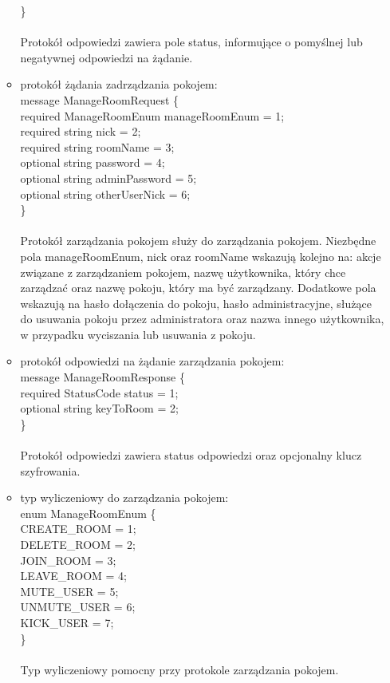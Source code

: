 \documentclass{article}
\begin{document}
\begin{itemize}
\begin{itemize}
				\}\\
				\\
				Protokół odpowiedzi zawiera pole status, informujące o pomyślnej lub negatywnej odpowiedzi na żądanie.
			\item protokół żądania zadrządzania pokojem:\\
				message ManageRoomRequest \{\\
					required ManageRoomEnum manageRoomEnum = 1;\\
					required string nick = 2;\\
					required string roomName = 3;\\
					optional string password = 4;\\
					optional string adminPassword = 5;\\
					optional string otherUserNick = 6;\\
				\}\\
				\\
				Protokół zarządzania pokojem służy do zarządzania pokojem. Niezbędne pola manageRoomEnum, nick oraz roomName wskazują kolejno na: akcje związane z zarządzaniem pokojem, nazwę użytkownika, który chce zarządzać oraz nazwę pokoju, który ma być zarządzany. Dodatkowe pola wskazują na hasło dołączenia do pokoju, hasło administracyjne, służące do usuwania pokoju przez administratora oraz nazwa innego użytkownika, w przypadku wyciszania lub usuwania z pokoju.
			\item protokół odpowiedzi na żądanie zarządzania pokojem:\\
				message ManageRoomResponse \{\\
					required StatusCode status = 1;\\
					optional string keyToRoom = 2;\\
				\}\\
				\\
				Protokół odpowiedzi zawiera status odpowiedzi oraz opcjonalny klucz szyfrowania.
			\item typ wyliczeniowy do zarządzania pokojem:\\
				enum ManageRoomEnum \{\\
					CREATE\_ROOM = 1;\\
					DELETE\_ROOM = 2;\\
					JOIN\_ROOM = 3;\\
					LEAVE\_ROOM = 4;\\
					MUTE\_USER = 5;\\
					UNMUTE\_USER = 6;\\
					KICK\_USER = 7;\\
				\}\\
				\\
				Typ wyliczeniowy pomocny przy protokole zarządzania pokojem.
				

\end{itemize}
\end{itemize}
\end{document}
